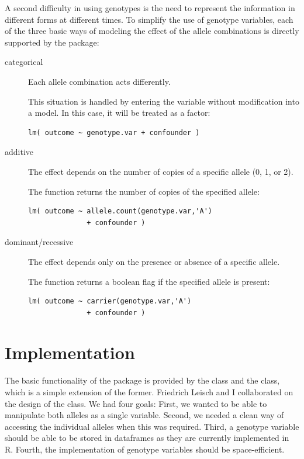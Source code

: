 \documentclass{report}
\begin{document}
A second difficulty in using genotypes is the need to represent the
information in different forms at different times.  To simplify the
use of genotype variables, each of the three basic ways of modeling
the effect of the allele combinations is directly supported by the
 package:
\begin{description}
\item[categorical] Each allele combination acts differently.
  
  This situation is handled by entering the  variable without
  modification into a model.  In this case, it will be treated as a
  factor:

{\small
\begin{verbatim}
lm( outcome ~ genotype.var + confounder )
\end{verbatim}
}
  
\item[additive] The effect depends on the number of copies of a
  specific allele (0, 1, or 2).
  
  The function  returns the number
  of copies of the specified allele:
  
{\small
\begin{verbatim}
lm( outcome ~ allele.count(genotype.var,'A') 
              + confounder )
\end{verbatim}
}
  
\item[dominant/recessive] The effect depends only on the presence or
  absence of a specific allele.
  
  The function  returns a boolean flag
  if the specified allele is present:

{\small
\begin{verbatim}
lm( outcome ~ carrier(genotype.var,'A') 
              + confounder )
\end{verbatim}
}

\end{description}

\section{Implementation}

The basic functionality of the  package is provided by
the  class and the  class, which is a
simple extension of the former.  Friedrich Leisch and I collaborated
on the design of the  class.  We had four goals: First,
we wanted to be able to manipulate both alleles as a single variable.
Second, we needed a clean way of accessing the individual alleles when
this was required.  Third, a genotype variable should be able to be
stored in dataframes as they are currently implemented in R.  Fourth,
the implementation of genotype variables should be space-efficient.
\end{document}

